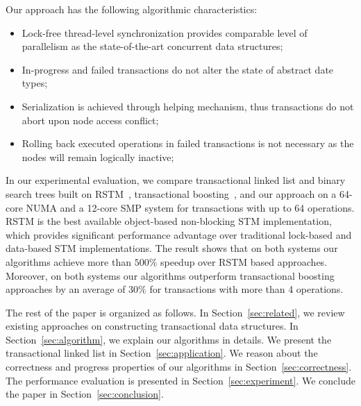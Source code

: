 \documentclass[10pt,conference,compsocconf]{IEEEtran}
\begin{document}
Our approach has the following algorithmic characteristics:
\begin{itemize}
    \item Lock-free thread-level synchronization provides comparable level of parallelism as the state-of-the-art concurrent data structures;
    \item In-progress and failed transactions do not alter the state of abstract date types;
    \item Serialization is achieved through helping mechanism, thus transactions do not abort upon node access conflict; 
    \item Rolling back executed operations in failed transactions is not necessary as the nodes will remain logically inactive;
\end{itemize}

In our experimental evaluation, we compare transactional linked list and binary search trees built on RSTM~\cite{marathe2006lowering}, transactional boosting~\cite{herlihy2008transactional}, and our approach on a 64-core NUMA and a 12-core SMP system for transactions with up to 64 operations.
RSTM is the best available object-based non-blocking STM implementation, which provides significant performance advantage over traditional lock-based and data-based STM implementations.
The result shows that on both systems our algorithms achieve more than $500\%$ speedup over RSTM based approaches.
Moreover, on both systems our algorithms outperform transactional boosting approaches by an average of $30\%$ for transactions with more than 4 operations.

The rest of the paper is organized as follows. 
In Section~\ref{sec:related}, we review existing approaches on constructing transactional data structures.
In Section~\ref{sec:algorithm}, we explain our algorithms in details.
We present the transactional linked list in Section~\ref{sec:application}.
We reason about the correctness and progress properties of our algorithms in Section~\ref{sec:correctness}.
The performance evaluation is presented in Section~\ref{sec:experiment}.
We conclude the paper in Section~\ref{sec:conclusion}.
\end{document}
